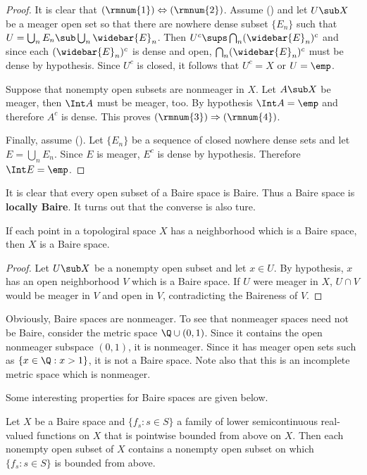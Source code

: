 \begin{proof}
It is clear that $(\rmnum{1})\Leftrightarrow(\rmnum{2})$. Assume () and let $U\sub X$ be a meager open set so that there are nowhere dense subset $\{E_n\}$ such that $U=\bigcup_nE_n\sub\bigcup_n\widebar{E}_n$. Then $U^c\sups\bigcap_n(\widebar{E}_n)^c$ and since each $(\widebar{E}_n)^c$ is dense and open, $\bigcap_n(\widebar{E}_n)^c$ must be dense by hypothesis. Since $U^c$ is closed, it follows that $U^c=X$ or $U=\emp$.\par
Suppose that nonempty open subsets are nonmeager in $X$. Let $A\sub X$ be meager, then $\Int A$ must be meager, too. By hypothesis $\Int A=\emp$ and therefore $A^c$ is dense. This proves $(\rmnum{3})\Rightarrow(\rmnum{4})$.\par
Finally, assume (). Let $\{E_n\}$ be a sequence of closed nowhere dense sets and let $E=\bigcup_nE_n$. Since $E$ is meager, $E^c$ is dense by hypothesis. Therefore $\Int E=\emp$.
\end{proof}
It is clear that every open subset of a Baire space is Baire. Thus a Baire space is \textbf{locally Baire}. It turns out that the converse is also ture.
\begin{proposition}\label{Baire iff locally Baire}
If each point in a topologiral space $X$ has a neighborhood which is a Baire space, then $X$ is a Baire space.
\end{proposition}
\begin{proof}
Let $U\sub X$ be a nonempty open subset and let $x\in U$. By hypothesis, $x$ has an open neighborhood $V$ which is a Baire space. If $U$ were meager in $X$, $U\cap V$ would be meager in $V$ and open in $V$, contradicting the Baireness of $V$.
\end{proof}
\begin{example}
Obviously, Baire spaces are nonmeager. To see that nonmeager spaces need not be Baire, consider the metric space $\Q\cup (0,1)$. Since it contains the open nonmeager subspace $(0,1)$, it is nonmeager. Since it has meager open sets such as $\{x\in\Q:x>1\}$, it is not a Baire space. Note also that this is an incomplete metric space which is nonmeager.
\end{example}
Some interesting properties for Baire spaces are given below.
\begin{proposition}\label{Baire space lsc function pointwise bounded above}
Let $X$ be a Baire space and $\{f_s:s\in S\}$ a family of lower semicontinuous real-valued functions on $X$ that is pointwise bounded from above on $X$. Then each nonempty open subset of $X$ contains a nonempty open subset on which $\{f_s:s\in S\}$ is bounded from above.
\end{proposition}
